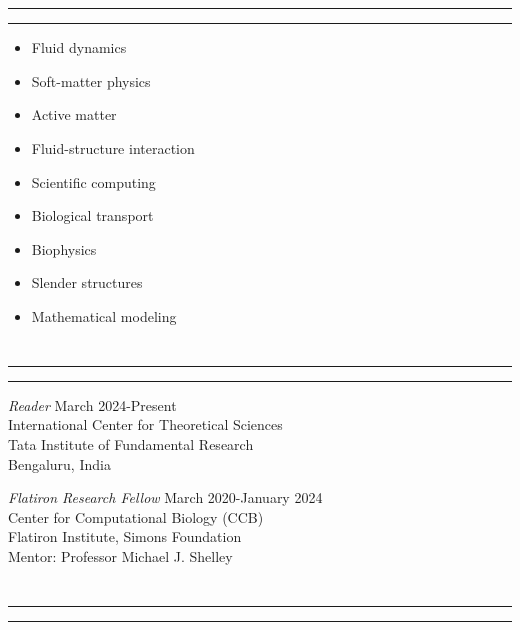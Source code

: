 \documentclass[10pt]{res} %
\begin{document}
\begin{resume}
\vspace*{-2mm}
\section{}
\hrule
\hrule
\vspace*{4mm} %
\begin{multicols}{3}
	\begin{itemize}
		\item[] Fluid dynamics
		\item[] Soft-matter physics
		\item[] Active matter
		\item[] Fluid-structure interaction
		\item[] Scientific computing
		\item[] Biological transport
		\item[] Biophysics
		\item[] Slender structures
		\item[] Mathematical modeling
	\end{itemize}
\end{multicols}

\vspace*{-4mm}
\section{}
\hrule
\hrule

\vspace*{4mm} %
{\sl Reader} \hfill March 2024-Present \\
International Center for Theoretical Sciences \\ 
Tata Institute of Fundamental Research \\
Bengaluru, India 

\vspace*{4mm} %
{\sl Flatiron Research Fellow} \hfill March 2020-January 2024 \\
Center for Computational Biology (CCB)  \\
Flatiron Institute, Simons Foundation  \\
Mentor: Professor Michael J. Shelley 


 
\vspace*{-2mm}
\section{}
\hrule
\hrule


\end{resume}
\end{document}
